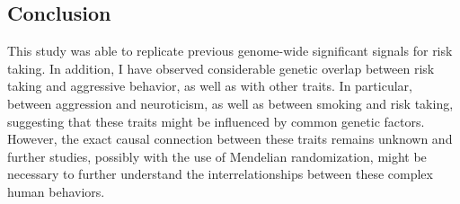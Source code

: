 \subsection{Conclusion}
\label{sub:conclusion_assoc}

This study was able to replicate previous genome-wide significant signals for risk taking.
In addition, I have observed considerable genetic overlap between risk taking and aggressive behavior, as well as with other traits.
In particular, between aggression and neuroticism, as well as between smoking and risk taking, 
suggesting that these traits might be influenced by common genetic factors.
However, the exact causal connection between these traits remains unknown and further studies, possibly with the use of Mendelian randomization, might be necessary to further understand the interrelationships between these complex human behaviors. 
